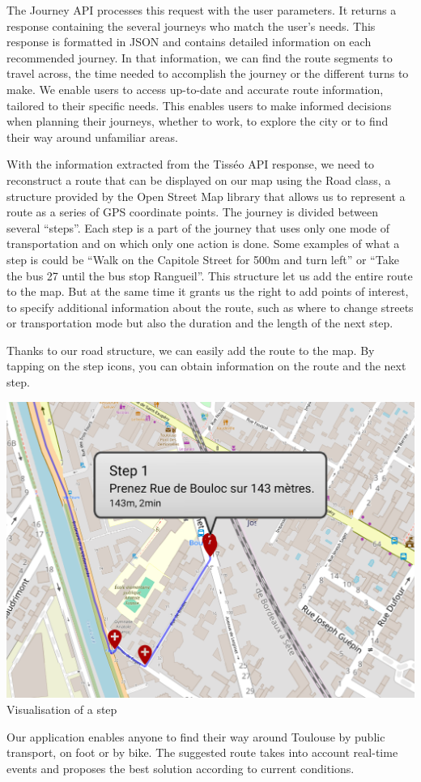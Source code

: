 The Journey API processes this request with the user parameters. It returns a response containing the several journeys who match the user's needs. This response is formatted in JSON and contains detailed information on each recommended journey. In that information, we can find the route segments to travel across, the time needed to accomplish the journey or the different turns to make. We enable users to access up-to-date and accurate route information, tailored to their specific needs. This enables users to make informed decisions when planning their journeys, whether to work, to explore the city or to find their way around unfamiliar areas.\newline

With the information extracted from the Tisséo API response, we need to reconstruct a route that can be displayed on our map using the Road class, a structure provided by the Open Street Map library that allows us to represent a route as a series of GPS coordinate points. The journey is divided between several “steps”. Each step is a part of the journey that uses only one mode of transportation and on which only one action is done. Some examples of what a step is could be “Walk on the Capitole Street for 500m and turn left” or “Take the bus 27 until the bus stop Rangueil”. This structure let us add the entire route to the map. But at the same time it grants us the right to add points of interest, to specify additional information about the route, such as where to change streets or transportation mode but also the duration and the length of the next step.\newline

Thanks to our road structure, we can easily add the route to the map. By tapping on the step icons, you can obtain information on the route and the next step.\newline

\begin{center}
\includegraphics[scale=0.30]{content/step_cut.png} 
\newline
Visualisation of a step
\newline
\end{center}

Our application enables anyone to find their way around Toulouse by public transport, on foot or by bike. The suggested route takes into account real-time events and proposes the best solution according to current conditions.\newline
